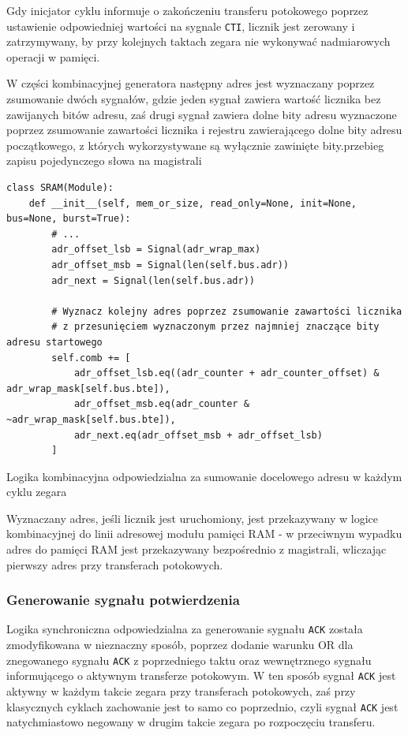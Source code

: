 Gdy inicjator cyklu informuje o zakończeniu transferu potokowego poprzez ustawienie odpowiedniej wartości na sygnale \texttt{CTI}, licznik jest zerowany i zatrzymywany, by przy kolejnych taktach zegara nie wykonywać nadmiarowych operacji w pamięci.

W części kombinacyjnej generatora następny adres jest wyznaczany poprzez zsumowanie dwóch sygnałów, gdzie jeden sygnał zawiera wartość licznika bez zawijanych bitów adresu, zaś drugi sygnał zawiera dolne bity adresu wyznaczone poprzez zsumowanie zawartości licznika i rejestru zawierającego dolne bity adresu początkowego, z których wykorzystywane są wyłącznie zawinięte bity.przebieg zapisu pojedynczego słowa na magistrali

\begin{listing}[H]
\begin{verbatim}
class SRAM(Module):
    def __init__(self, mem_or_size, read_only=None, init=None, bus=None, burst=True):
        # ...
        adr_offset_lsb = Signal(adr_wrap_max)
        adr_offset_msb = Signal(len(self.bus.adr))
        adr_next = Signal(len(self.bus.adr))

        # Wyznacz kolejny adres poprzez zsumowanie zawartości licznika
        # z przesunięciem wyznaczonym przez najmniej znaczące bity adresu startowego
        self.comb += [
            adr_offset_lsb.eq((adr_counter + adr_counter_offset) & adr_wrap_mask[self.bus.bte]),
            adr_offset_msb.eq(adr_counter & ~adr_wrap_mask[self.bus.bte]),
            adr_next.eq(adr_offset_msb + adr_offset_lsb)
        ]
\end{verbatim}
\caption{Logika kombinacyjna odpowiedzialna za sumowanie docelowego adresu w każdym cyklu zegara}
\label{lst:impl-sram-adrnext}
\end{listing}

Wyznaczany adres, jeśli licznik jest uruchomiony, jest przekazywany w logice kombinacyjnej do linii adresowej modułu pamięci RAM - w przeciwnym wypadku adres do pamięci RAM jest przekazywany bezpośrednio z magistrali, wliczając pierwszy adres przy transferach potokowych.

\subsubsection{Generowanie sygnału potwierdzenia}

Logika synchroniczna odpowiedzialna za generowanie sygnału \texttt{ACK} została zmodyfikowana w nieznaczny sposób, poprzez dodanie warunku OR dla znegowanego sygnału \texttt{ACK} z poprzedniego taktu oraz wewnętrznego sygnału informującego o aktywnym transferze potokowym. W ten sposób sygnał \texttt{ACK} jest aktywny w każdym takcie zegara przy transferach potokowych, zaś przy klasycznych cyklach zachowanie jest to samo co poprzednio, czyli sygnał \texttt{ACK} jest natychmiastowo negowany w drugim takcie zegara po rozpoczęciu transferu.


